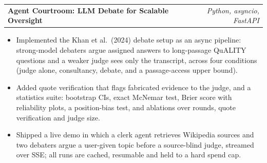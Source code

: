 \documentclass[letterpaper,11pt]{article}
\begin{document}
\begin{tabularx}{\linewidth}{ @{}X r@{} }
\textbf{Agent Courtroom: LLM Debate for Scalable Oversight} %
 & \textit{\small Python, asyncio, FastAPI} \\
\end{tabularx}
\vspace{-1.2em}
\begin{itemize}
    \item[--] Implemented the Khan et al.\ (2024) debate setup as an async pipeline: strong-model debaters argue assigned answers to long-passage QuALITY questions and a weaker judge sees only the transcript, across four conditions (judge alone, consultancy, debate, and a passage-access upper bound).\vspace{-0.5em}
    \item[--] Added quote verification that flags fabricated evidence to the judge, and a statistics suite: bootstrap CIs, exact McNemar test, Brier score with reliability plots, a position-bias test, and ablations over rounds, quote verification and judge size.\vspace{-0.5em}
    \item[--] Shipped a live demo in which a clerk agent retrieves Wikipedia sources and two debaters argue a user-given topic before a source-blind judge, streamed over SSE; all runs are cached, resumable and held to a hard spend cap.
\end{itemize}
\vspace{-0.2em}
\end{document}
